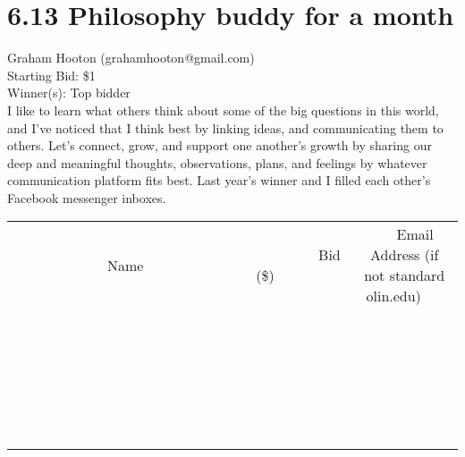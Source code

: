 \documentclass[11pt]{article}
\begin{document}
\section*{6.13 Philosophy buddy for a month}
Graham Hooton (grahamhooton@gmail.com) \\
Starting Bid: \$1 \\
Winner(s): 
Top bidder \\
I like to learn what others think about some of the big questions in this world, and I’ve noticed that I think best by linking ideas, and communicating them to others. Let’s connect, grow, and support one another’s growth by sharing our deep and meaningful thoughts, observations, plans, and feelings by whatever communication platform fits best. Last year’s winner and I filled each other’s Facebook messenger inboxes. \\[6ex]
\begin{tabular}{c c c}
~~~~~~~~~~~~~Name~~~~~~~~~~~~~ & ~~~~~~~~~Bid (\$)~~~~~~~~~ & ~~~Email Address (if not standard olin.edu)~~~ \\
 & & \\
\hline
 & & \\
\hline
 & & \\
\hline
 & & \\
\hline
 & & \\
\hline
 & & \\
\hline
 & & \\
\hline
 & & \\
\hline
 & & \\
\hline
 & & \\
\hline
 & & \\
\hline
 & & \\
\hline
 & & \\
\hline
 & & \\
\hline
 & & \\
\hline
 & & \\
\hline
 & & \\
\hline
 & & \\
\hline
 & & \\
\hline
 & & \\
\hline
 & & \\
\hline
 & & \\
\hline
 & & \\
\hline
 & & \\
\hline
 & & \\
\hline
 & & \\
\hline
\end{tabular}
\clearpage
\end{document}
